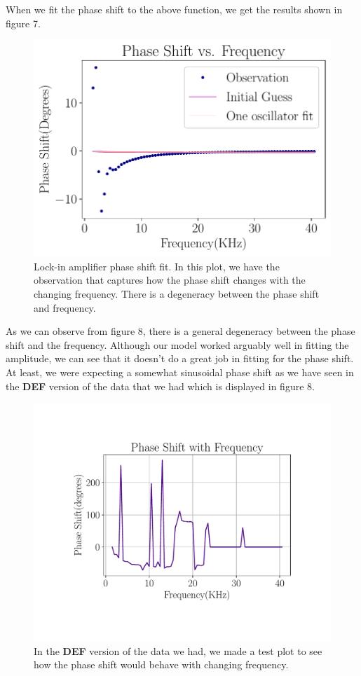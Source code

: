 \documentclass[twocolumn]{article}\usepackage[english]{babel}
\begin{document}
When we fit the phase shift to the above function, we get the results shown in figure 7.
\begin{figure}
\includegraphics[width=\linewidth]{images/v2/LP_Phase_Shift_Fit.pdf}
\caption{Lock-in amplifier phase shift fit. In this plot, we have the observation that captures how the phase shift changes with the changing frequency. There is a degeneracy between the phase shift and frequency. }
  \label{fig:lp PS  fit}
\end{figure}
As we can observe from figure 8, there is a general degeneracy between the phase shift and the frequency. Although our model worked arguably well in fitting the amplitude, we can see that it doesn't do a great job in fitting for the phase shift. At least, we were expecting a somewhat sinusoidal phase shift as we have seen in the \textbf{DEF} version of the data that we had which is displayed in figure 8.
\begin{figure}
\includegraphics[width=\linewidth]{images/v2/fp.pdf}
\caption{In the \textbf{DEF} version of the data we had, we made a test plot to see   how the phase shift would behave with changing frequency.}
  \label{fig:PS s fit}
\end{figure}
\end{document}
